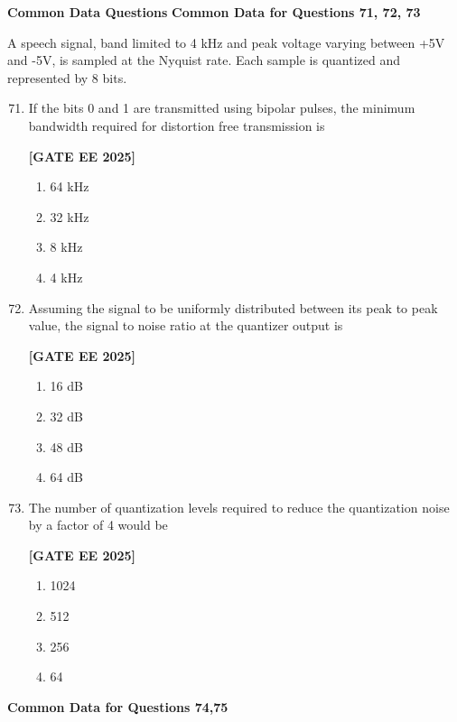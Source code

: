 \documentclass[12pt]{article}
\begin{document}
\vspace{1em}
 \large \textbf {Common Data Questions}
 \large \textbf {Common Data for Questions 71, 72, 73}
\vspace{1em}
 
A speech signal, band limited to 4 kHz and peak voltage varying between +5V and -5V, is sampled at the Nyquist rate. Each sample is quantized and represented by 8 bits.

\begin{enumerate}[leftmargin=*, label=\textbf{Q.\arabic*:}]
\setcounter{enumi}{70}

\item If the bits 0 and 1 are transmitted using bipolar pulses, the minimum bandwidth required for distortion free transmission is
 
\noindent \textbf{[GATE EE 2025]}
\begin{enumerate}[label=(\Alph*)]
  \item 64 kHz
  \item 32 kHz
  \item 8 kHz
  \item 4 kHz
\end{enumerate}

\item Assuming the signal to be uniformly distributed between its peak to peak value, the signal to noise ratio at the quantizer output is
 
\noindent \textbf{[GATE EE 2025]}
\begin{enumerate}[label=(\Alph*)]
  \item 16 dB
  \item 32 dB
  \item 48 dB
  \item 64 dB
\end{enumerate}

\item The number of quantization levels required to reduce the quantization noise by a factor of 4 would be
 
\noindent \textbf{[GATE EE 2025]}
\begin{enumerate}[label=(\Alph*)]
  \item 1024
  \item 512
  \item 256
  \item 64
\end{enumerate}

\end{enumerate}

\vspace{1em}
 \large \textbf {Common Data for Questions 74,75}
\vspace{1em}
\end{document}
